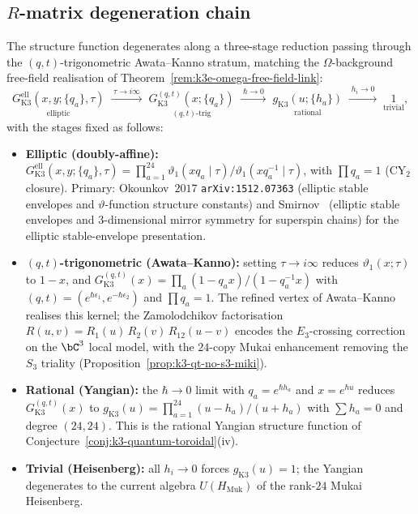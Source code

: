 \subsection{\texorpdfstring{$R$}{R}-matrix degeneration chain}
\label{sec:rmatrix-degeneration}

The structure function degenerates along a three-stage reduction
passing through the $(q, t)$-trigonometric Awata--Kanno stratum,
matching the $\Omega$-background free-field realisation of
Theorem~\ref{rem:k3e-omega-free-field-link}:
\[
 \underset{\text{elliptic}}{G^{\mathrm{ell}}_{\mathrm{K3}}(x, y; \{q_a\}, \tau)}
 \;\xrightarrow{\;\tau \to i\infty\;}\;
 \underset{(q, t)\text{-trig}}{G^{(q, t)}_{\mathrm{K3}}(x; \{q_a\})}
 \;\xrightarrow{\;\hbar \to 0\;}\;
 \underset{\text{rational}}{g_{\mathrm{K3}}(u; \{h_a\})}
 \;\xrightarrow{\;h_i \to 0\;}\;
 \underset{\text{trivial}}{1},
\]
with the stages fixed as follows:
\begin{itemize}
\item \textbf{Elliptic (doubly-affine):}
 $G^{\mathrm{ell}}_{\mathrm{K3}}(x, y; \{q_a\}, \tau)
 = \prod_{a = 1}^{24}
 \vartheta_1(x q_a\mid \tau)/\vartheta_1(x q_a^{-1}\mid \tau)$,
 with $\prod q_a = 1$ (CY$_2$ closure).
 Primary: Okounkov~$2017$ \texttt{arXiv:1512.07363} (elliptic
 stable envelopes and $\vartheta$-function structure constants) and
 Smirnov~\cite{Smirnov2020} (elliptic stable envelopes and
 $3$-dimensional mirror symmetry for superspin chains) for the
 elliptic stable-envelope presentation.
\item \textbf{$(q, t)$-trigonometric (Awata--Kanno):} setting
 $\tau \to i\infty$ reduces $\vartheta_1(x; \tau)$ to $1 - x$, and
 $G^{(q, t)}_{\mathrm{K3}}(x) = \prod_a (1 - q_a x)/(1 - q_a^{-1} x)$
 with $(q, t) = (e^{\hbar\epsilon_1}, e^{-\hbar\epsilon_2})$ and
 $\prod q_a = 1$. The refined vertex of Awata--Kanno
 \cite{AwataKanno2008} realises this kernel; the Zamolodchikov
 factorisation
 $R(u, v) = R_1(u)\, R_2(v)\, R_{12}(u - v)$ encodes the $E_3$-crossing
 correction on the $\bC^3$ local model, with the $24$-copy Mukai
 enhancement removing the $S_3$ triality
 (Proposition~\ref{prop:k3-qt-no-s3-miki}).
\item \textbf{Rational (Yangian):} the $\hbar \to 0$ limit with
 $q_a = e^{\hbar h_a}$ and $x = e^{\hbar u}$ reduces
 $G^{(q, t)}_{\mathrm{K3}}(x)$ to
 $g_{\mathrm{K3}}(u) = \prod_{a = 1}^{24} (u - h_a)/(u + h_a)$
 with $\sum h_a = 0$ and degree $(24, 24)$. This is the rational
 Yangian structure function of
 Conjecture~\ref{conj:k3-quantum-toroidal}(iv).
\item \textbf{Trivial (Heisenberg):} all $h_i \to 0$ forces
 $g_{\mathrm{K3}}(u) = 1$; the Yangian degenerates to the current
 algebra $U(H_{\mathrm{Muk}})$ of the rank-$24$ Mukai Heisenberg.
\end{itemize}

